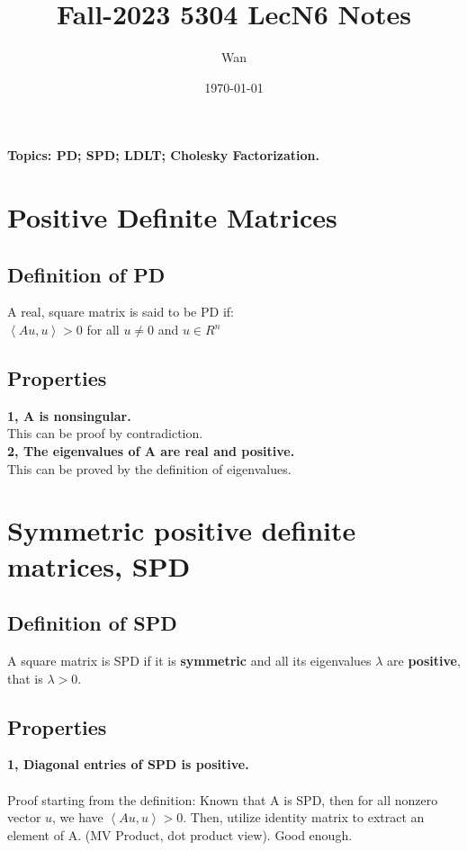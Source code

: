 \documentclass{article}
\begin{document}
\title{Fall-2023 5304 LecN6 Notes}
\author{Wan}
\date{\today}
\maketitle

\noindent
\textbf{Topics: PD; SPD; LDLT; Cholesky Factorization.}

\section{Positive Definite Matrices}

\subsection*{Definition of PD}
A real, square matrix is said to be PD if:\\
$\left\langle Au,u\right\rangle > 0$ for all $u \neq 0$ and $u \in R^n$

\subsection*{Properties}
\textbf{1, A is nonsingular.}\\
This can be proof by contradiction.\\

\noindent
\textbf{2, The eigenvalues of A are real and positive.}\\
This can be proved by the definition of eigenvalues.\\

\pagebreak
\section{Symmetric positive definite matrices, SPD}
\subsection*{Definition of SPD}
A square matrix is SPD
if it is \textbf{symmetric} and all its eigenvalues $\lambda$ are \textbf{positive},
that is $\lambda > 0$.\\

\subsection*{Properties}
\textbf{1, Diagonal entries of SPD is positive.}\\
\\
Proof starting from the definition: Known that A is SPD, then
for all nonzero vector $u$, we have $\left\langle Au,u\right\rangle > 0$.
\noindent
Then, utilize identity matrix to extract an element of A. (MV Product, dot product view). Good enough.\\
\end{document}
